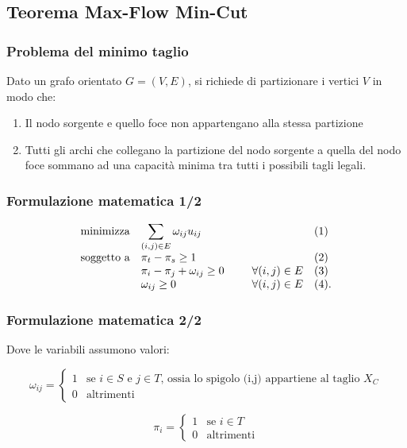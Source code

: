 \documentclass[10pt]{beamer}
\begin{document}
\subsection{Teorema Max-Flow Min-Cut}
\begin{frame}
  \frametitle{Problema del minimo taglio}

  Dato un grafo orientato $G = (V, E)$, si richiede di partizionare i vertici $V$ in modo che:

  \begin{enumerate}
    \item Il nodo sorgente e quello foce non appartengano alla stessa partizione 
    \item Tutti gli archi che collegano la partizione del nodo sorgente a quella del nodo foce sommano ad una capacità minima tra tutti i possibili tagli legali.
  \end{enumerate}


\end{frame}
\begin{frame}
  \frametitle{Formulazione matematica 1/2}

  \begin{equation*}
      \begin{array}{ll@{}ll}
      \text{minimizza}    & \displaystyle\sum_{(i, j) \in E} \omega_{ij}u_{ij} &  &(1)\\
      \text{soggetto a}   & \displaystyle \pi_t - \pi_s \geq 1 &   &(2)\\
                          & \displaystyle \pi_i - \pi_j  + \omega_{ij} \geq 0\;\;\;\;\;\;\;\;\; & \forall (i,j) \in E & (3)\\
                          & \displaystyle \omega_{ij} \geq 0 & \forall (i,j) \in E & (4).\\
    \end{array}
  \end{equation*}

\end{frame}
\begin{frame}
  \frametitle{Formulazione matematica 2/2}

  Dove le variabili assumono valori:

  \begin{equation*}
    \omega_{ij} =
        \begin{cases}
        1 & \text{se $i \in S$ e $j \in T$, ossia lo spigolo (i,j) appartiene al taglio $X_C$}\\
        0 & \text{altrimenti}
        \end{cases}       
  \end{equation*}

  \begin{equation*}
      \pi_{i} =
          \begin{cases}
          1 & \text{se $i \in T$}\\
          0 & \text{altrimenti}
          \end{cases}       
  \end{equation*}

\end{frame}
\end{document}
